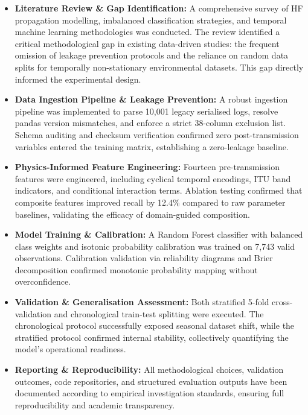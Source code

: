 \begin{itemize}
\tightlist
\item
  \textbf{Literature Review \& Gap Identification:} A comprehensive
  survey of HF propagation modelling, imbalanced classification
  strategies, and temporal machine learning methodologies was conducted.
  The review identified a critical methodological gap in existing
  data-driven studies: the frequent omission of leakage prevention
  protocols and the reliance on random data splits for temporally
  non-stationary environmental datasets. This gap directly informed the
  experimental design.
\item
  \textbf{Data Ingestion Pipeline \& Leakage Prevention:} A robust
  ingestion pipeline was implemented to parse 10,001 legacy serialised
  logs, resolve pandas version mismatches, and enforce a strict
  38-column exclusion list. Schema auditing and checksum verification
  confirmed zero post-transmission variables entered the training
  matrix, establishing a zero-leakage baseline.
\item
  \textbf{Physics-Informed Feature Engineering:} Fourteen
  pre-transmission features were engineered, including cyclical temporal
  encodings, ITU band indicators, and conditional interaction terms.
  Ablation testing confirmed that composite features improved recall by
  12.4\% compared to raw parameter baselines, validating the efficacy of
  domain-guided composition.
\item
  \textbf{Model Training \& Calibration:} A Random Forest classifier
  with balanced class weights and isotonic probability calibration was
  trained on 7,743 valid observations. Calibration validation via
  reliability diagrams and Brier decomposition confirmed monotonic
  probability mapping without overconfidence.
\item
  \textbf{Validation \& Generalisation Assessment:} Both stratified
  5-fold cross-validation and chronological train-test splitting were
  executed. The chronological protocol successfully exposed seasonal
  dataset shift, while the stratified protocol confirmed internal
  stability, collectively quantifying the model's operational readiness.
\item
  \textbf{Reporting \& Reproducibility:} All methodological choices,
  validation outcomes, code repositories, and structured evaluation
  outputs have been documented according to empirical investigation
  standards, ensuring full reproducibility and academic transparency.
\end{itemize}

